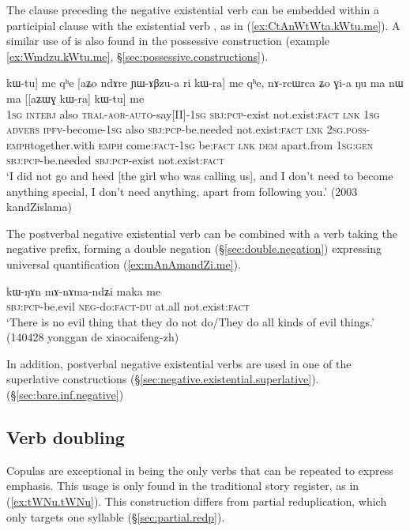 The clause preceding the negative existential verb can be embedded within a participial clause with the existential verb , as in (\ref{ex:CtAnWtWta.kWtu.me}). A similar use of  is also found in the possessive construction (example \ref{ex:Wmdzu.kWtu.me}, §\ref{sec:possessive.constructions}).

\begin{exe}
\ex \label{ex:CtAnWtWta.kWtu.me} 
\gll [[aʑo joβ tɕi ɕ-tɤ-nɯ-tɯt-a] kɯ-tu] me qʰe  [aʑo ndɤre ɲɯ-ɤβzu-a ri kɯ-ra] me qʰe, nɤ-rcɯ\redp{}rca ʑo ɣi-a ŋu ma nɯ ma [[aʑɯɣ kɯ-ra] kɯ-tu] me \\
\textsc{1sg} \textsc{interj} also \textsc{tral}-\textsc{aor}-\textsc{auto}-say[II]-\textsc{1sg} \textsc{sbj}:\textsc{pcp}-exist not.exist:\textsc{fact} \textsc{lnk} \textsc{1sg} \textsc{advers} \textsc{ipfv}-become-\textsc{1sg} also \textsc{sbj}:\textsc{pcp}-be.needed not.exist:\textsc{fact} \textsc{lnk} \textsc{2sg}.\textsc{poss}-\textsc{emph}\redp{}together.with \textsc{emph} come:\textsc{fact}-\textsc{1sg} be:\textsc{fact} \textsc{lnk} \textsc{dem} apart.from \textsc{1sg}:\textsc{gen} \textsc{sbj}:\textsc{pcp}-be.needed \textsc{sbj}:\textsc{pcp}-exist not.exist:\textsc{fact} \\
\glt `I did not go and heed [the girl who was calling us], and I don't need to become anything special, I don't need anything, apart from following you.' (2003 kandZislama)
\end{exe}

The postverbal negative existential verb can be combined with a verb taking the negative prefix, forming a double negation (§\ref{sec:double.negation}) expressing universal quantification (\ref{ex:mAnAmandZi.me}).

\begin{exe}
\ex \label{ex:mAnAmandZi.me}
\gll kɯ-ŋɤn mɤ-nɤma-ndʑi maka me\\
\textsc{sbj}:\textsc{pcp}-be.evil \textsc{neg}-do:\textsc{fact}-\textsc{du} at.all not.exist:\textsc{fact}   \\
\glt `There is no evil thing that they do not do/They do all kinds of evil things.' (140428 yonggan de xiaocaifeng-zh)
 \end{exe}

In addition, postverbal negative existential verbs are used in one of the superlative constructions (§\ref{sec:negative.existential.superlative}).
(§\ref{sec:bare.inf.negative})

\subsection{Verb doubling} \label{sec:verb.doubling}
Copulas are exceptional in being the only verbs that can be repeated to express emphasis. This usage is only found in the traditional story register, as in (\ref{ex:tWNu.tWNu}). This construction differs from partial reduplication, which only targets one syllable (§\ref{sec:partial.redp}).

